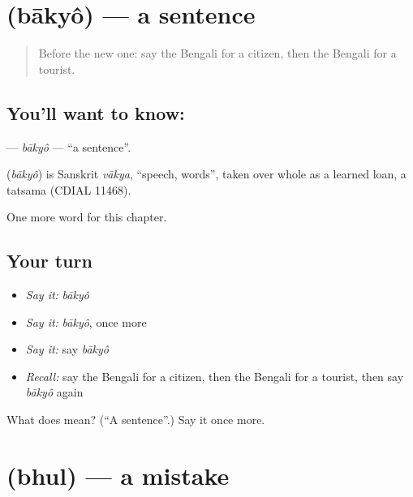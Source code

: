 \section[\texorpdfstring{\bn{বাক্য} (bākyô)}{বাক্য (bākyô)}]{ (bākyô) — a sentence}

\label{lesson:BN-C199-bakyo}



\begin{quote}
Before the new one: say the Bengali for a citizen, then the Bengali for a tourist.
\end{quote}

\subsection*{You'll want to know: }
\textbf{} — \emph{bākyô} — \textquotedblleft{}a sentence\textquotedblright{}.

\begin{cousinweb}
\textbf{} (\emph{bākyô}) is Sanskrit \emph{vākya}, \textquotedblleft{}speech, words\textquotedblright{}, taken over whole as a learned loan, a tatsama (CDIAL 11468).
\end{cousinweb}

\begin{grammarlens}[title={What you've built}]
One more word for this chapter.
\end{grammarlens}

\subsection*{Your turn}
\begin{itemize}
\raggedright
  \item \emph{Say it:} \emph{bākyô}
  \item \emph{Say it:} \emph{bākyô}, once more
  \item \emph{Say it:} say \emph{bākyô}
  \item \emph{Recall:} say the Bengali for a citizen, then the Bengali for a tourist, then say \emph{bākyô} again
\end{itemize}

\begin{tcolorbox}[breakable,colback=teal!4,colframe=teal!35!black,title={Before you move on}]
What does  mean? (\textquotedblleft{}A sentence\textquotedblright{}.) Say it once more.
\end{tcolorbox}
\section[\texorpdfstring{\bn{ভুল} (bhul)}{ভুল (bhul)}]{ (bhul) — a mistake}

